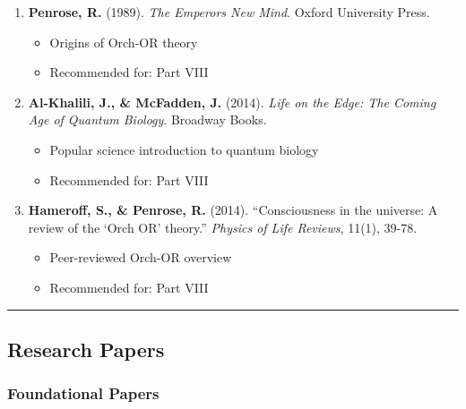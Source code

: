 \begin{enumerate}
\def\labelenumi{\arabic{enumi}.}
\setcounter{enumi}{13}
\tightlist
\item
  \textbf{Penrose, R.} (1989). \emph{The Emperor\textquotesingle s New
  Mind}. Oxford University Press.

  \begin{itemize}
  \tightlist
  \item
    Origins of Orch-OR theory
  \item
    Recommended for: Part VIII
  \end{itemize}
\item
  \textbf{Al-Khalili, J., \& McFadden, J.} (2014). \emph{Life on the
  Edge: The Coming Age of Quantum Biology}. Broadway Books.

  \begin{itemize}
  \tightlist
  \item
    Popular science introduction to quantum biology
  \item
    Recommended for: Part VIII
  \end{itemize}
\item
  \textbf{Hameroff, S., \& Penrose, R.} (2014). ``Consciousness in the
  universe: A review of the `Orch OR' theory.'' \emph{Physics of Life
  Reviews}, 11(1), 39-78.

  \begin{itemize}
  \tightlist
  \item
    Peer-reviewed Orch-OR overview
  \item
    Recommended for: Part VIII
  \end{itemize}
\end{enumerate}

\begin{center}\rule{0.5\linewidth}{0.5pt}\end{center}

\subsection{\texorpdfstring{Research Papers}{Research Papers}}\label{research-papers}

\subsubsection{Foundational Papers}\label{foundational-papers}

